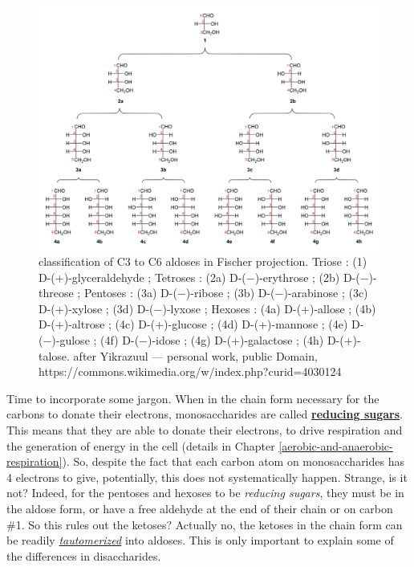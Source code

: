 \documentclass[]{book}
\theoremstyle{definition}
\theoremstyle{definition}
\theoremstyle{definition}
\theoremstyle{remark}
\begin{document}
\begin{figure}

{\centering \includegraphics[width=1\linewidth]{pictures/aldoses+nb} 

}

\caption{classification of C3 to C6 aldoses in Fischer projection. Triose : (1) D-(+)-glyceraldehyde ; Tetroses : (2a) D-(−)-erythrose ; (2b) D-(−)-threose ; Pentoses : (3a) D-(−)-ribose ; (3b) D-(−)-arabinose ; (3c) D-(+)-xylose ; (3d) D-(−)-lyxose ; Hexoses : (4a) D-(+)-allose ; (4b) D-(+)-altrose ; (4c) D-(+)-glucose ; (4d) D-(+)-mannose ; (4e) D-(−)-gulose ; (4f) D-(−)-idose ; (4g) D-(+)-galactose ; (4h) D-(+)-talose. after Yikrazuul — personal work, public Domain, https://commons.wikimedia.org/w/index.php?curid=4030124  }\label{fig:aldoses}
\end{figure}

Time to incorporate some jargon. When in the chain form necessary for
the carbons to donate their electrons, monosaccharides are called
\textbf{\href{https://en.wikipedia.org/wiki/Reducing_sugar}{reducing
sugars}}. This means that they are able to donate their electrons, to
drive respiration and the generation of energy in the cell (details in
Chapter \ref{aerobic-and-anaerobic-respiration}). So, despite the fact
that each carbon atom on monosaccharides has 4 electrons to give,
potentially, this does not systematically happen. Strange, is it not?
Indeed, for the pentoses and hexoses to be \emph{reducing sugars}, they
must be in the aldose form, or have a free aldehyde at the end of their
chain or on carbon \#1. So this rules out the ketoses? Actually no, the
ketoses in the chain form can be readily
\emph{\href{https://en.wikipedia.org/wiki/Tautomer}{tautomerized}} into
aldoses. This is only important to explain some of the differences in
disaccharides.
\end{document}
